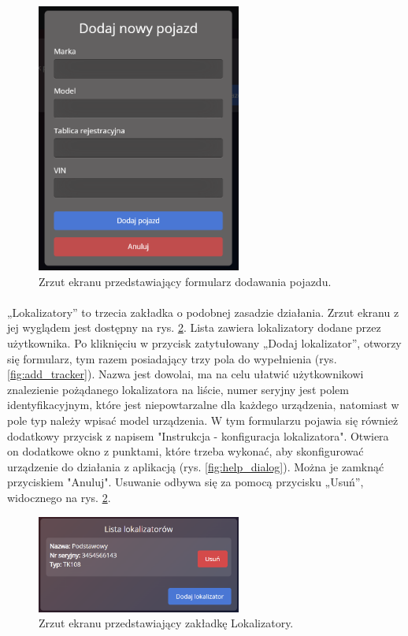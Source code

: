 \begin{figure}
	\centering
	\includegraphics[width=0.6\textwidth]{./graf/add_vehicle.png}
	\caption{Zrzut ekranu przedstawiający formularz dodawania pojazdu.}
	\label{fig:add_vehicle}
\end{figure}

\paragraph{}
„Lokalizatory” to trzecia zakładka o podobnej zasadzie działania. Zrzut ekranu z jej wyglądem jest dostępny na rys. \ref{fig:tracker_tab}. Lista zawiera lokalizatory dodane przez użytkownika. Po kliknięciu w przycisk zatytułowany „Dodaj lokalizator”, otworzy się formularz, tym razem posiadający trzy pola do wypełnienia (rys.\ref{fig:add_tracker}). Nazwa jest dowolai, ma na celu ułatwić użytkownikowi znalezienie pożądanego lokalizatora na liście, numer seryjny jest polem identyfikacyjnym, które jest niepowtarzalne dla każdego urządzenia, natomiast w pole typ należy wpisać model urządzenia. W tym formularzu pojawia się również dodatkowy przycisk z napisem "Instrukcja - konfiguracja lokalizatora". Otwiera on dodatkowe okno z punktami, które trzeba wykonać, aby skonfigurować urządzenie do działania z aplikacją (rys. \ref{fig:help_dialog}). Można je zamknąć przyciskiem "Anuluj". Usuwanie odbywa się za pomocą przycisku „Usuń”, widocznego na rys. \ref{fig:tracker_tab}.

\begin{figure}
	\centering
	\includegraphics[width=0.6\textwidth]{./graf/tracker_tab.png}
	\caption{Zrzut ekranu przedstawiający zakładkę Lokalizatory.}
	\label{fig:tracker_tab}
\end{figure}

